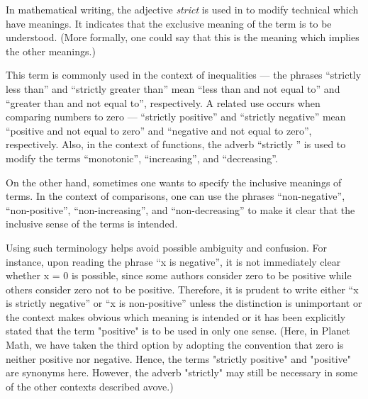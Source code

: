 \documentclass[12pt]{article}
\begin{document}
In mathematical writing, the adjective \emph{strict} is used in to modify technical  which have  meanings.  It indicates that the exclusive meaning of the term is to be understood.  (More formally, one could say that this is the meaning which implies the other meanings.)

This term is commonly used in the context of inequalities --- the phrases ``strictly less than'' and ``strictly greater than'' mean ``less than and not equal to'' and ``greater than and not equal to'', respectively.  A related use occurs when comparing numbers to zero --- ``strictly positive'' and ``strictly negative'' mean ``positive and not equal to zero'' and ``negative and not equal to zero'', respectively.  Also, in the context of functions, the adverb ``strictly '' is used to modify the terms ``monotonic'', ``increasing'', and ``decreasing''.

On the other hand, sometimes one wants to specify the inclusive meanings of terms.  In the context of comparisons, one can use the phrases ``non-negative'', ``non-positive'', ``non-increasing'', and ``non-decreasing'' to make it clear that the inclusive sense of the terms is intended.

Using such terminology helps avoid possible ambiguity and confusion.  For instance, upon reading the phrase ``x is negative'', it is not immediately clear whether x = 0 is possible, since some authors consider zero to be positive while others consider zero not to be positive.  Therefore, it is prudent to write either ``x is strictly negative'' or ``x is non-positive'' unless the distinction is unimportant or the context makes obvious which meaning is intended or it has been explicitly stated that the term "positive" is to be used in only one sense.  (Here, in Planet Math, we have taken the third option by adopting the convention that zero is neither positive nor negative.  Hence, the terms "strictly positive" and "positive" are synonyms here.  However, the adverb "strictly" may still be necessary in some of the other contexts described avove.)
\end{document}
